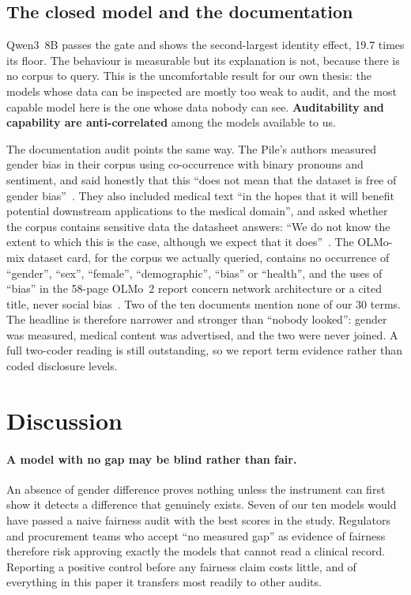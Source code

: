 \documentclass[11pt,twocolumn]{article}
\begin{document}
\subsection{The closed model and the documentation}
\label{sec:docs}

Qwen3~8B passes the gate and shows the second-largest identity effect, 19.7
times its floor. The behaviour is measurable but its explanation is not, because
there is no corpus to query. This is the uncomfortable result for our own thesis:
the models whose data can be inspected are mostly too weak to audit, and the
most capable model here is the one whose data nobody can see.
\textbf{Auditability and capability are anti-correlated} among the models
available to us.

The documentation audit points the same way. The Pile's authors measured gender
bias in their corpus using co-occurrence with binary pronouns and sentiment, and
said honestly that this ``does not mean that the dataset is free of gender
bias''~\cite{r17}. They also included medical text ``in the hopes that it will
benefit potential downstream applications to the medical domain'', and asked
whether the corpus contains sensitive data the datasheet answers: ``We do not
know the extent to which this is the case, although we expect that it
does''~\cite{r4}. The OLMo-mix dataset card, for the corpus we
actually queried, contains no occurrence of ``gender'', ``sex'', ``female'',
``demographic'', ``bias'' or ``health'', and the uses of ``bias'' in the 58-page
OLMo~2 report concern network architecture or a cited title, never social
bias~\cite{r7}. Two of the ten documents mention none of our 30 terms. The
headline is therefore narrower and stronger than ``nobody looked'': gender was
measured, medical content was advertised, and the two were never joined. A full
two-coder reading is still outstanding, so we report term evidence rather than
coded disclosure levels.
\section{Discussion}

\paragraph{A model with no gap may be blind rather than fair.} An absence of
gender difference proves nothing unless the instrument can first show it detects
a difference that genuinely exists. Seven of our ten models would have passed a
naive fairness audit with the best scores in the study. Regulators and
procurement teams who accept ``no measured gap'' as evidence of fairness
therefore risk approving exactly the models that cannot read a clinical record.
Reporting a positive control before any fairness claim costs little, and of
everything in this paper it transfers most readily to other audits.
\end{document}
